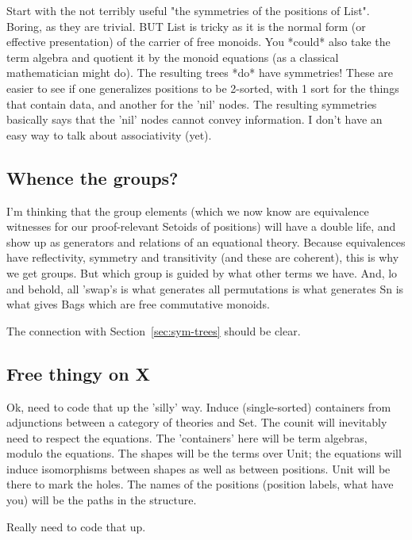 \documentclass{article} %
\theoremstyle{plain}
\theoremstyle{definition}
\begin{document}
Start with the not terribly useful "the symmetries of the positions of List".
Boring, as they are trivial. BUT List is tricky as it is the normal form (or
effective presentation) of the carrier of free monoids. You *could* also take
the term algebra and quotient it by the monoid equations (as a classical
mathematician might do). The resulting trees *do* have symmetries! These are
easier to see if one generalizes positions to be 2-sorted, with 1 sort for the
things that contain data, and another for the 'nil' nodes. The resulting
symmetries basically says that the 'nil' nodes cannot convey information. I
don't have an easy way to talk about associativity (yet).  

\subsection{Whence the groups?}

I'm thinking that the group elements (which we now know are equivalence
witnesses for our proof-relevant Setoids of positions) will have a double life,
and show up as generators and relations of an equational theory. Because
equivalences have reflectivity, symmetry and transitivity (and these are
coherent), this is why we get groups. But which group is guided by what other
terms we have. And, lo and behold, all 'swap's is what generates all
permutations is what generates Sn is what gives Bags which are free commutative
monoids.

The connection with Section~\ref{sec:sym-trees} should be clear.

\subsection{Free thingy on X}

Ok, need to code that up the 'silly' way. Induce (single-sorted)
containers from adjunctions between a category of theories and Set.
The counit will inevitably need to respect the equations. The 'containers'
here will be term algebras, modulo the equations. The shapes will be the
terms over Unit; the equations will induce isomorphisms between shapes
as well as between positions.  Unit will be there to mark the holes. The
names of the positions (position labels, what have you) will be the paths
in the structure.

Really need to code that up.
\end{document}
